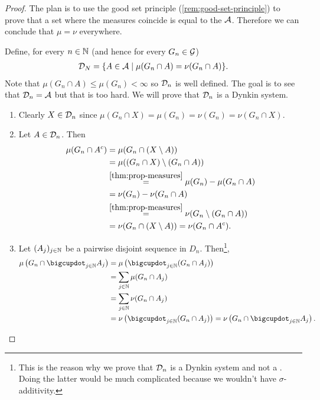 \begin{proof}
	The plan is to use the good set principle (\autoref{rem:good-set-principle}) to prove that a set where the measures coincide is equal to the \siga $\sa$. Therefore we can conclude that $\mu = \nu$ everywhere.
	
	Define, for every $n \in \N$ (and hence for every $G_n \in \calG$)
	\begin{align}
		\calD_N = \{ A \in \sa \mid \mu(G_n \cap A) = \nu(G_n \cap A)\}.
	\end{align}
	Note that $\mu(G_n\cap A) \leq \mu(G_n) < \infty$ so $\calD_n$ is well defined. The goal is to see that $\calD_n = \sa$ but that is too hard. We will prove that $\calD_n$ is a Dynkin system.
	\begin{enumerate}
		\item Clearly $X \in \calD_n$ since $\mu(G_n \cap X) = \mu(G_n) = \nu(G_n) = \nu(G_n \cap X)$.
		\item Let $A \in \calD_n$. Then
		\begin{align*}
			\mu(G_n \cap A^\complement)
			&= \mu(G_n \cap (X\setminus A))\\
			&= \mu((G_n \cap X) \setminus (G_n \cap A))\\
			&\overset{\ref{thm:prop-measures}}{=} \mu(G_n) - \mu(G_n \cap A)\\
			&= \nu(G_n) - \nu(G_n \cap A)\\
			&\overset{\ref{thm:prop-measures}}{=} \nu(G_n \setminus (G_n \cap A))\\
			&= \nu (G_n \cap (X \setminus A))
			= \nu(G_n \cap A^\complement).
		\end{align*}
		\item Let $(A_j)_{j\in\N}$ be a pairwise disjoint sequence in $D_n$. Then\footnote{This is the reason why we prove that $\calD_n$ is a Dynkin system and not a \siga. Doing the latter would be much complicated because we wouldn't have $\sigma$-additivity.},
		\begin{align*}
			\mu\left( G_n \cap \bigcupdot_{j \in \N} A_j \right)
			&= \mu\left(\bigcupdot_{j \in \N} (G_n \cap A_j) \right)\\
			&= \sum_{j\in\N} \mu(G_n \cap A_j)\\
			&= \sum_{j\in\N} \nu(G_n \cap A_j)\\
			&= \nu\left(\bigcupdot_{j \in \N} (G_n \cap A_j) \right)
			= \nu\left( G_n \cap \bigcupdot_{j \in \N} A_j \right).
		\end{align*}
	\end{enumerate}


\end{proof}
